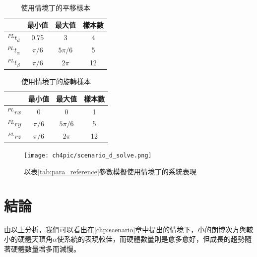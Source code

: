 \begin{table}[htpb]
    \begin{center}
      \caption{使用情境丁的平移樣本}
      \label{tab:C_translate}
      \begin{tabular}{c|c|c|c} %
         & \textbf{最小值} & \textbf{最大值}&\textbf{樣本數}\\
        \hline
        $^{PL}t_d$ & 0.75 &3&4\\
        $^{PL}t_{\alpha}$ & $\pi/6$ & $5\pi/6$ & 5\\
        $^{PL}t_{\beta}$ & $\pi/6$ & $2\pi$ &12\\
      \end{tabular}
    \end{center}
  \end{table}

  \begin{table}[htpb]
    \begin{center}
      \caption{使用情境丁的旋轉樣本}
      \label{tab:C_translate}
      \begin{tabular}{c|c|c|c} %
         & \textbf{最小值} & \textbf{最大值}&\textbf{樣本數}\\
        \hline
        $^{PL}rx$ & 0 &0&1\\
        $^{PL}ry$ & $\pi/6$ & $5\pi/6$ & 5\\
        $^{PL}rz$ & $\pi/6$ & $2\pi$ &12\\
      \end{tabular}
    \end{center}
  \end{table}

\begin{figure}[htpb]
    \centering
    \texttt{[image: ch4pic/scenario\_d\_solve.png]}
    \caption{以表\ref{tab:para_reference}參數模擬使用情境丁的系統表現}
    \label{pic:scenario_d_solve}
\end{figure}



\section{結論}
\label{chp:4_conclusion}
由以上分析，我們可以看出在\ref{chp:scenario}章中提出的情境下，小的朗博次方與較小的硬體天頂角$\alpha$使系統的表現較佳，而硬體數量則是愈多愈好，但成長的趨勢隨著硬體數量增多而減慢。

